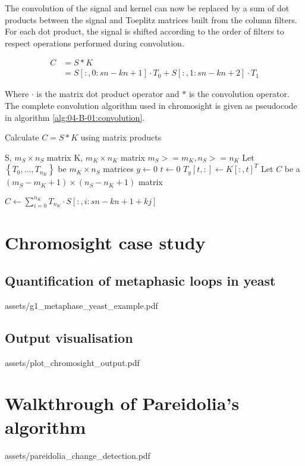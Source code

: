 The convolution of the signal and kernel can now be replaced by a sum of dot products between the signal and Toeplitz matrices built from the column filters. For each dot product, the signal is shifted according to the order of filters to respect operations performed during convolution.

\begin{align}
    C &= S * K \\
      &= S[:, 0: sn-kn+1] \cdot T_0 + S[:, 1:sn-kn+2] \cdot T_1
\end{align}

Where $\cdot$ is the matrix dot product operator and $*$ is the convolution operator.
The complete convolution algorithm used in chromosight is given as pseudocode in algorithm \ref{alg:04-B-01:convolution}.

\begin{algorithm}
\caption{Calculate $C = S * K$ using matrix products}
\label{alg:04-B-01:convolution}
\begin{algorithmic}
\REQUIRE S, $m_S \times n_S$ matrix
\REQUIRE K, $m_K \times n_K$ matrix
\ENSURE $m_S >= m_K, n_S >= n_K$
\STATE Let $\left\{T_0, ..., T_{n_K}\right\}$ be $m_K \times n_S$ matrices
\STATE $y \leftarrow 0$
    \STATE $t \leftarrow 0$
        \STATE $T_y[t, :] \leftarrow K[:, t]^T$
    \ENDWHILE
\ENDWHILE
\STATE Let $C$ be a $(m_S - m_K + 1) \times (n_S - n_K + 1)$ matrix

\STATE $C \leftarrow \sum_{i=0}^{n_K}{T_{n_K} \cdot S[: , i: sn-kn+1+kj]}$ 
\end{algorithmic}
\end{algorithm}


\chapter{Chromosight case study}
\label{ch:04-B:demo}

\section{Quantification of metaphasic loops in yeast}
 {assets/g1_metaphase_yeast_example.pdf}    

\section{Output visualisation}
 {assets/plot_chromosight_output.pdf}

\chapter{Walkthrough of Pareidolia's algorithm}
\label{ch:04-C:pareidolia}

 {assets/pareidolia_change_detection.pdf}